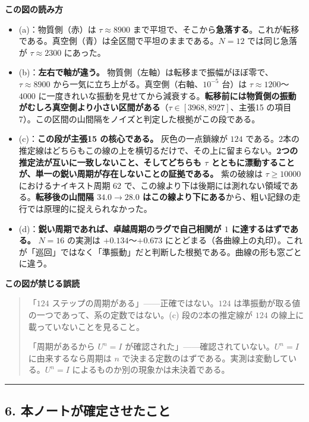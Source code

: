 \documentclass[
  10pt,
]{ltjsarticle}
\providecommand{\tightlist}{%
  \setlength{\itemsep}{0pt}\setlength{\parskip}{0pt}}
\begin{document}
\textbf{この図の読み方}

\begin{itemize}
\tightlist
\item
  (a)：物質側（赤）は \(\tau \approx 8900\)
  まで平坦で、そこから\textbf{急落する}。これが転移である。真空側（青）は全区間で平坦のままである。\(N=12\)
  では同じ急落が \(\tau \approx 2300\) にあった。
\item
  (b)：\textbf{左右で軸が違う。}
  物質側（左軸）は転移まで振幅がほぼ零で、\(\tau \approx 8900\)
  から一気に立ち上がる。真空側（右軸、\(10^{-5}\) 台）は
  \(\tau \approx 1200\)〜\(4000\)
  に一度きれいな振動を見せてから減衰する。\textbf{転移前には物質側の振動がむしろ真空側より小さい区間がある}（\(\tau\in[3968,8927]\)、主張15
  の項目7）。この区間の山間隔をノイズと判定した根拠がこの段である。
\item
  (c)：\textbf{この段が主張15 の核心である。} 灰色の一点鎖線が \(124\)
  である。2本の推定線はどちらもこの線の上を横切るだけで、その上に留まらない。\textbf{2つの推定法が互いに一致しないこと、そしてどちらも
  \(\tau\)
  とともに漂動することが、単一の鋭い周期が存在しないことの証拠である。}
  紫の破線は \(\tau \ge 10000\) におけるナイキスト周期 \(62\)
  で、この線より下は後期には測れない領域である。\textbf{転移後の山間隔
  \(34.0 \to 28.0\)
  はこの線より下にある}から、粗い記録の走行では原理的に捉えられなかった。
\item
  (d)：\textbf{鋭い周期であれば、卓越周期のラグで自己相関が \(1\)
  に達するはずである。} \(N=16\) の実測は \(+0.134\)〜\(+0.673\)
  にとどまる（各曲線上の丸印）。これが「巡回」ではなく「準振動」だと判断した根拠である。曲線の形も窓ごとに違う。
\end{itemize}

\textbf{この図が禁じる誤読}

\begin{quote}
「\(124\) ステップの周期がある」------正確ではない。\(124\)
は準振動が取る値の一つであって、系の定数ではない。(c) 段の2本の推定線が
\(124\) の線上に載っていないことを見ること。

「周期があるから \(U^n = I\)
が確認された」------確認されていない。\(U^n = I\) に由来するなら周期は
\(n\) で決まる定数のはずである。実測は変動している。\(U^n = I\)
によるものか別の現象かは未決着である。
\end{quote}

\begin{center}\rule{0.5\linewidth}{0.5pt}\end{center}

\subsection{6.
本ノートが確定させたこと}\label{ux672cux30ceux30fcux30c8ux304cux78baux5b9aux3055ux305bux305fux3053ux3068}
\end{document}
